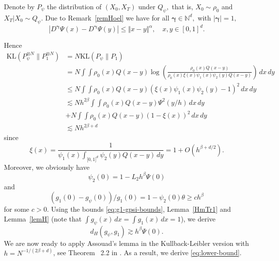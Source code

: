 \documentclass[a4paper,11pt]{amsart}
\theoremstyle{plain}
\theoremstyle{remark}
\begin{document}
 Denote by
$P_{\psi}$ the distribution of $(X_{0},X_{T})$ under $Q_{\psi},$ that is,
$X_{0}\sim\rho_{0}$ and $X_{T}|X_{0}\sim Q_{\psi}.$ Due to Remark~\ref{remHoel} we
have for all $\boldsymbol{\gamma}\in\mathbb{N}^{d},$ with $\left\vert
\boldsymbol{\gamma}\right\vert =1,$
\[
\left\vert D^{\boldsymbol{\gamma}}\Psi(x)-D^{\boldsymbol{\gamma}}%
\Psi(y)\right\vert \leq\Vert x-y\Vert^{\alpha},\quad x,y\in [0,1]^{d}.
\]

Hence 
\begin{align*}
\mathrm{KL}(P_{\psi}^{\otimes N}\|P_{1}^{\otimes N}) &=N\mathrm{KL}(P_{\psi}\|P_{1})  \\
 & = N\int\int\rho_{0}(x)Q(x-y)\log\left(\frac{\rho_0(x) Q(x-y)}{\rho_0(x)\xi(x)\psi_{1}(x)\psi_{2}(y)Q(x-y)}\right)\,dx\,dy
 \\
 & \leq N\int\int\rho_{0}(x)Q(x-y)\left(\xi(x)\psi_{1}(x)\psi_{2}(y)-1\right)^{2}\,dx\,dy\\
 & \lesssim  Nh^{2\beta}\int\int\rho_{0}(x)Q(x-y)\Psi^2(y/h)\,dx\,dy
\\
 &
 +N\int\int\rho_{0}(x)Q(x-y)(1-\xi(x))^2\,dx\,dy
 \\
 & \lesssim Nh^{2\beta+d}
\end{align*}
since 
\[
\xi(x)=\frac{1}{\psi_{1}(x)\int_{\lbrack0,1]^{d}}\psi_{2}(y)Q(x-y)\,dy}=1+O(h^{\beta+d/2}).
\]
Moreover, we obviously have
\[
\psi_{2}(0)=1-L_{2}h^{\beta}\Psi(0)
\]
and
\[
(g_{1}(0)-g_{\psi}(0))/g_{1}(0)=1-\psi_2(0)\theta\geq ch^{\beta}
\]
for some $c>0.$
Using the bounds \eqref{eq:g1-gpsi-bounds}, Lemma~\ref{HmTr1} and Lemma~\ref{lemH}  (note that $\int g_{\psi}(x)\,dx=\int g_{1}(x)\,dx=1$), we derive
\[
d_H(g_{\psi},g_{1})\gtrsim h^{\beta}\Psi(0).
\]
We are now ready to apply Assouad's lemma in the Kullback-Leibler version with $h=N^{-1/(2\beta+d)}$, see Theorem ~2.2 in \cite{tsybakov2003introduction}. As a result, we derive \eqref{eq:lower-bound}.
\appendix
\end{document}

